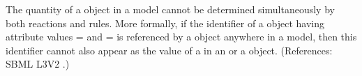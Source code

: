 The quantity of a \Species object in a model cannot be determined
simultaneously by both reactions and rules.  More formally, if the
identifier of a \Species object having attribute values
= and = is
referenced by a \SpeciesReference object anywhere in a model, then this
identifier cannot also appear as the value of a  in an
\AssignmentRule or a \RateRule object.  (References: SBML L3V2
.)
